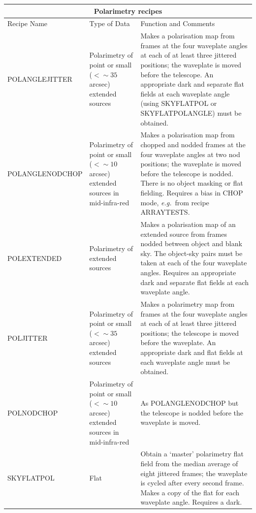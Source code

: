 \documentclass[twoside,11pt]{article}
\newcommand{\htmlref}[2]{#1}
\renewcommand{\_}{\texttt{\symbol{95}}}
\begin{document}
\begin{center}
\begin{tabular}{|l|p{29mm}|p{78mm}|}
\multicolumn{3}{c}{\large{\bf Polarimetry recipes}} \vspace*{1ex} \\
\hline
Recipe Name & Type of Data & Function and Comments \\ \hline
\htmlref{POL\_ANGLE\_JITTER}{POL\_ANGLE\_JITTER} & 
   Polarimetry of point or small ($<\sim35$ arcsec) extended sources &
   Makes a polarisation map from frames at the four waveplate angles at
   each of at least three jittered positions; the waveplate is moved
   before the telescope.  An appropriate dark and separate flat fields
   at each waveplate angle (using SKY\_FLAT\_POL or SKY\_FLAT\_POL\_ANGLE)
   must be obtained. \\ \hline
\htmlref{POL\_ANGLE\_NOD\_CHOP}{POL\_ANGLE\_NOD\_CHOP} & 
   Polarimetry of point or small ($<\sim10$ arcsec) extended sources in
   mid-infra-red &
   Makes a polarisation map from chopped and nodded frames at the four
   waveplate angles at two nod positions; the waveplate is moved before
   the telescope is nodded.  There is no object masking or flat fielding.
   Requires a bias in CHOP mode, {\em e.g.}\ from recipe ARRAY\_TESTS. \\ \hline
\htmlref{POL\_EXTENDED}{POL\_EXTENDED} &
   Polarimetry of extended sources &
   Makes a polarisation map of an extended source from frames
   nodded between object and blank sky.  The object-sky pairs
   must be taken at each of the four waveplate angles.  Requires
   an appropriate dark and separate flat fields at each waveplate
   angle. \\ \hline
\htmlref{POL\_JITTER}{POL\_JITTER} & 
   Polarimetry of point or small ($<\sim35$ arcsec) extended sources &
   Makes a polarimetry map from frames at the four waveplate angles at
   each of at least three jittered positions; the telescope is moved
   before the waveplate.  An appropriate dark and flat fields at each
   waveplate angle must be obtained.\\ \hline
\htmlref{POL\_NOD\_CHOP}{POL\_NOD\_CHOP} & 
   Polarimetry of point or small ($<\sim10$ arcsec) extended sources in
   mid-infra-red &
   As \htmlref{POL\_ANGLE\_NOD\_CHOP}{POL\_ANGLE\_NOD\_CHOP} but
   the telescope is nodded before the waveplate is moved.  \\ \hline
\htmlref{SKY\_FLAT\_POL}{SKY\_FLAT\_POL} & Flat &
   Obtain a `master' polarimetry flat field from the median average
   of eight jittered frames; the waveplate is cycled after
   every second frame.  Makes a copy of the flat for each
   waveplate angle.  Requires a dark.\\ \hline
\end{tabular}
\end{center}
\end{document}
